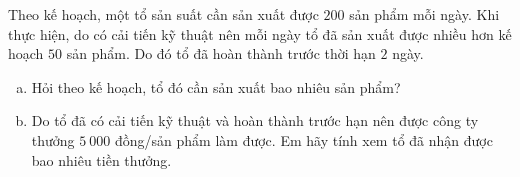 \begin{bt}%
	Theo kế hoạch, một tổ sản suất cần sản xuất được $200$ sản phẩm mỗi ngày. Khi thực hiện, do có cải tiến kỹ thuật nên mỗi ngày tổ đã sản xuất được nhiều hơn kế hoạch $50$ sản phẩm. Do đó tổ đã hoàn thành trước thời hạn $2$ ngày. 
		\begin{enumerate}[a)]
			\item Hỏi theo kế hoạch, tổ đó cần sản xuất bao nhiêu sản phẩm?
						\item Do tổ đã có cải tiến kỹ thuật và hoàn thành trước hạn nên được công ty thưởng $5~000$ đồng/sản phẩm làm được. Em hãy tính xem tổ đã nhận được bao nhiêu tiền thưởng.
				\end{enumerate}
\end{bt}

